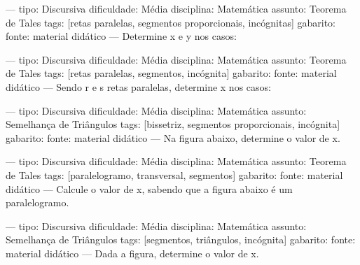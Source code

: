 
---
tipo: Discursiva
dificuldade: Média
disciplina: Matemática
assunto: Teorema de Tales
tags: [retas paralelas, segmentos proporcionais, incógnitas]
gabarito:
fonte: material didático
---
\question
Determine x e y nos casos:
\begin{parts}
\part 
\part 
\end{parts}


---
tipo: Discursiva
dificuldade: Média
disciplina: Matemática
assunto: Teorema de Tales
tags: [retas paralelas, segmentos, incógnita]
gabarito:
fonte: material didático
---
\question
Sendo r e s retas paralelas, determine x nos casos:
\begin{parts}
\part
\part
\end{parts}


---
tipo: Discursiva
dificuldade: Média
disciplina: Matemática
assunto: Semelhança de Triângulos
tags: [bissetriz, segmentos proporcionais, incógnita]
gabarito:
fonte: material didático
---
\question
Na figura abaixo, determine o valor de x.


---
tipo: Discursiva
dificuldade: Média
disciplina: Matemática
assunto: Teorema de Tales
tags: [paralelogramo, transversal, segmentos]
gabarito:
fonte: material didático
---
\question
Calcule o valor de x, sabendo que a figura abaixo é um paralelogramo.


---
tipo: Discursiva
dificuldade: Média
disciplina: Matemática
assunto: Semelhança de Triângulos
tags: [segmentos, triângulos, incógnita]
gabarito:
fonte: material didático
---
\question
Dada a figura, determine o valor de x.

